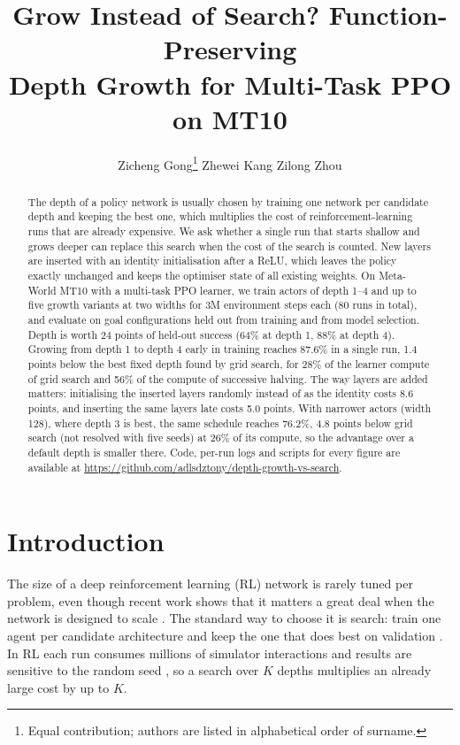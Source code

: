\documentclass{article}
\title{Grow Instead of Search? Function-Preserving\\Depth Growth for Multi-Task PPO on MT10}
\author{%
  Zicheng Gong\thanks{Equal contribution; authors are listed in alphabetical order of surname.} \qquad
  Zhewei Kang\footnotemark[1] \qquad
  Zilong Zhou\footnotemark[1]
}
\newcommand{\coderepo}{\url{https://github.com/adlsdztony/depth-growth-vs-search}}
\begin{document}
\maketitle

\begin{abstract}
The depth of a policy network is usually chosen by training one network per candidate depth and keeping the best one, which multiplies the cost of reinforcement-learning runs that are already expensive.
We ask whether a single run that starts shallow and grows deeper can replace this search when the cost of the search is counted.
New layers are inserted with an identity initialisation after a ReLU, which leaves the policy exactly unchanged and keeps the optimiser state of all existing weights.
On Meta-World MT10 with a multi-task PPO learner, we train actors of depth 1--4 and up to five growth variants at two widths for 3M environment steps each (80 runs in total), and evaluate on goal configurations held out from training and from model selection.
Depth is worth 24 points of held-out success (64\% at depth 1, 88\% at depth 4).
Growing from depth 1 to depth 4 early in training reaches 87.6\% in a single run, 1.4 points below the best fixed depth found by grid search, for 28\% of the learner compute of grid search and 56\% of the compute of successive halving.
The way layers are added matters: initialising the inserted layers randomly instead of as the identity costs 8.6 points, and inserting the same layers late costs 5.0 points.
With narrower actors (width 128), where depth 3 is best, the same schedule reaches 76.2\%, 4.8 points below grid search (not resolved with five seeds) at 26\% of its compute, so the advantage over a default depth is smaller there.
Code, per-run logs and scripts for every figure are available at \coderepo.
\end{abstract}

\section{Introduction}

The size of a deep reinforcement learning (RL) network is rarely tuned per problem, even though recent work shows that it matters a great deal when the network is designed to scale \citep{nauman2024bro,lee2025simba}.
The standard way to choose it is search: train one agent per candidate architecture and keep the one that does best on validation \citep{elsken2019nas}.
In RL each run consumes millions of simulator interactions and results are sensitive to the random seed \citep{henderson2018matters}, so a search over $K$ depths multiplies an already large cost by up to $K$.
\end{document}
